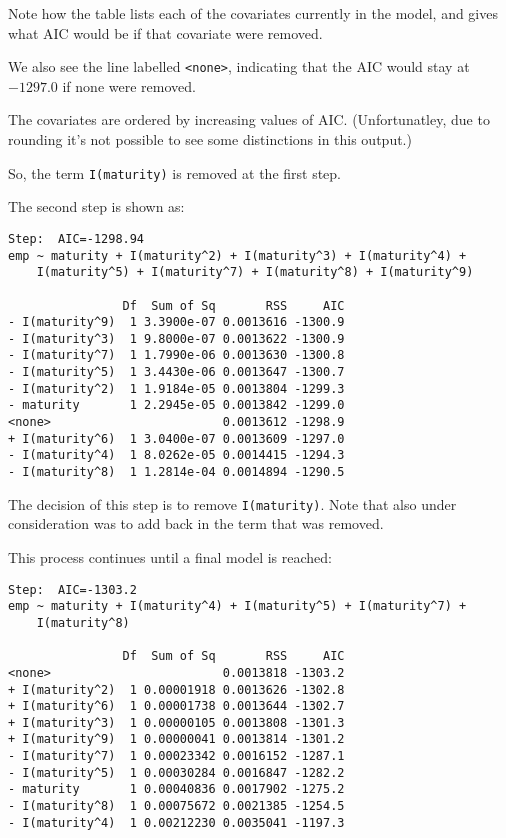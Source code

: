 \documentclass{report}
\begin{document}
Note how the table lists each of the covariates currently in the
model, and gives what AIC would be if that covariate were removed.

We also see the line labelled {\tt <none>}, indicating that the
AIC would stay at $-1297.0$ if none were removed.

The covariates are ordered by increasing values of AIC. (Unfortunatley,
due to rounding it's not possible to see some distinctions in this output.)

\newpage
So, the term {\tt I(maturity)} is removed at the first step.

The second step is shown as:

\vspace{-.4in}
\normalsize
\begin{verbatim}
Step:  AIC=-1298.94
emp ~ maturity + I(maturity^2) + I(maturity^3) + I(maturity^4) + 
    I(maturity^5) + I(maturity^7) + I(maturity^8) + I(maturity^9)

                Df  Sum of Sq       RSS     AIC
- I(maturity^9)  1 3.3900e-07 0.0013616 -1300.9
- I(maturity^3)  1 9.8000e-07 0.0013622 -1300.9
- I(maturity^7)  1 1.7990e-06 0.0013630 -1300.8
- I(maturity^5)  1 3.4430e-06 0.0013647 -1300.7
- I(maturity^2)  1 1.9184e-05 0.0013804 -1299.3
- maturity       1 2.2945e-05 0.0013842 -1299.0
<none>                        0.0013612 -1298.9
+ I(maturity^6)  1 3.0400e-07 0.0013609 -1297.0
- I(maturity^4)  1 8.0262e-05 0.0014415 -1294.3
- I(maturity^8)  1 1.2814e-04 0.0014894 -1290.5
\end{verbatim}
\Large

The decision of this step is to remove {\tt I(maturity)}. Note that
also under consideration was to add back in the term that was removed.

\newpage
This process continues until a final model is reached:

\vspace{-.4in}
\normalsize
\begin{verbatim}
Step:  AIC=-1303.2
emp ~ maturity + I(maturity^4) + I(maturity^5) + I(maturity^7) + 
    I(maturity^8)

                Df  Sum of Sq       RSS     AIC
<none>                        0.0013818 -1303.2
+ I(maturity^2)  1 0.00001918 0.0013626 -1302.8
+ I(maturity^6)  1 0.00001738 0.0013644 -1302.7
+ I(maturity^3)  1 0.00000105 0.0013808 -1301.3
+ I(maturity^9)  1 0.00000041 0.0013814 -1301.2
- I(maturity^7)  1 0.00023342 0.0016152 -1287.1
- I(maturity^5)  1 0.00030284 0.0016847 -1282.2
- maturity       1 0.00040836 0.0017902 -1275.2
- I(maturity^8)  1 0.00075672 0.0021385 -1254.5
- I(maturity^4)  1 0.00212230 0.0035041 -1197.3
\end{verbatim}
\Large
\end{document}

